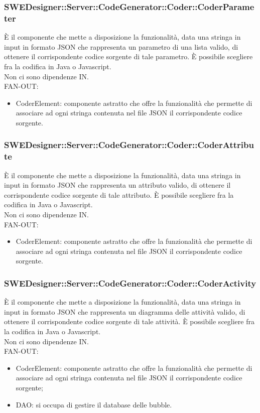 \documentclass[../DefinizioneDiProdotto.tex]{subfiles}
\begin{document}
				\subsubsection{SWEDesigner::Server::CodeGenerator::Coder::CoderParameter}
				È il componente che mette a disposizione la funzionalità, data una stringa in input in formato JSON che rappresenta un parametro di una lista valido, di ottenere il corrispondente codice sorgente di tale parametro. È possibile scegliere fra la codifica in Java o Javascript.\\
					Non ci sono dipendenze IN.\\
					FAN-OUT:
					\begin{itemize}
						\item CoderElement: componente astratto che offre la funzionalità che permette di associare ad ogni stringa contenuta nel file JSON il corrispondente codice sorgente.
					\end{itemize}

				\subsubsection{SWEDesigner::Server::CodeGenerator::Coder::CoderAttribute}
				È il componente che mette a disposizione la funzionalità, data una stringa in input in formato JSON che rappresenta un attributo valido, di ottenere il corrispondente codice sorgente di tale attributo. È possibile scegliere fra la codifica in Java o Javascript.\\
				Non ci sono dipendenze IN.\\
					FAN-OUT:
					\begin{itemize}
						\item CoderElement: componente astratto che offre la funzionalità che permette di associare ad ogni stringa contenuta nel file JSON il corrispondente codice sorgente.
					\end{itemize}

				\subsubsection{SWEDesigner::Server::CodeGenerator::Coder::CoderActivity}
				È il componente che mette a disposizione la funzionalità, data una stringa in input in formato JSON che rappresenta un diagramma delle attività valido, di ottenere il corrispondente codice sorgente di tale attività. È possibile scegliere fra la codifica in Java o Javascript.\\
					Non ci sono dipendenze IN.\\
					FAN-OUT:
					\begin{itemize}
						\item CoderElement: componente astratto che offre la funzionalità che permette di associare ad ogni stringa contenuta nel file JSON il corrispondente codice sorgente;
						\item DAO: si occupa di gestire il database delle bubble.
					\end{itemize}
\end{document}
